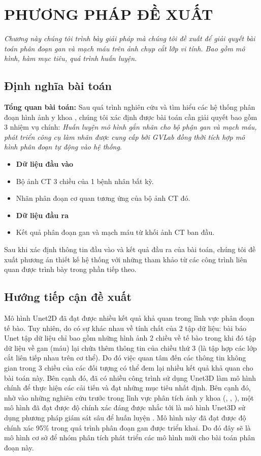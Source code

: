 \chapter{PHƯƠNG PHÁP ĐỀ XUẤT}\label{chap:proposedmethod}
\textit{Chương này chúng tôi trình bày giải pháp mà chúng tôi đề xuất để giải quyết bài toán phân đoạn gan và mạch máu trên ảnh chụp cắt lớp vi tính. Bao gồm mô hình, hàm mục tiêu, quá trình huấn luyện. }

\section{Định nghĩa bài toán}
\textbf{Tổng quan bài toán:} Sau quá trình nghiên cứu và tìm hiểu các hệ thống phân đoạn hình ảnh y khoa , chúng tôi xác định được bài toán cần giải quyết bao gồm 3 nhiệm vụ chính: \textit{Huấn luyện mô hình gắn nhãn cho bộ phận gan và mạch máu, phát triển công cụ làm nhãn được cung cấp bởi GVLab đồng thời tích hợp mô hình phân đoạn tự động vào hệ thống}.
\vspace{-0.25cm}
\begin{itemize}
    \item[] \textbf{Dữ liệu đầu vào}
    \item Bộ ảnh CT 3 chiều của 1 bệnh nhân bất kỳ.
    \item Nhãn phân đoạn cơ quan tương ứng của bộ ảnh CT đó.
    
    \item[] \textbf{Dữ liệu đầu ra}
    \item Kết quả phân đoạn gan và mạch máu từ khối ảnh CT ban đầu.
\end{itemize}
\vspace{-0.25cm}
Sau khi xác định thông tin đầu vào và kết quả đầu ra của bài toán, chúng tôi đề xuất phương án thiết kế hệ thống với những tham khảo từ các công trình liên quan được trình bày trong phần tiếp theo.

\section{Hướng tiếp cận đề xuất}
Mô hình Unet2D \cite{Unet} đã đạt được nhiều kết quả khả quan trong lĩnh vực phân đoạn tế bào. Tuy nhiên, do có sự khác nhau về tính chất của 2 tập dữ liệu: bài báo Unet tập dữ liệu chỉ bao gồm những hình ảnh 2 chiều về tế bào trong khi đó tập dữ liệu về gan (máu) lại chứa thêm thông tin của chiều thứ 3 (là tập hợp các lớp cắt liên tiếp nhau trên cơ thể). Do đó việc quan tâm đến các thông tin không gian trong 3 chiều của các đối tượng có thể đem lại nhiều kết quả khả quan cho bài toán này. Bên cạnh đó, đã có nhiều công trình sử dụng Unet3D \cite{unet3d} làm mô hình chính để thực hiện các cải tiến và đạt những mục tiêu nhất định. Bên cạnh đó, nhờ vào những nghiên cứu trước trong lĩnh vực phân tích ảnh y khoa (\cite{Deepsupervision}, \cite{LV_LIVER}, \cite{LV_VESEL}), một mô hình đã đạt được độ chính xác đáng được nhắc tới là mô hình Unet3D sử dụng phương pháp giám sát sâu để huấn luyện \cite{Deepsupervision}. Mô hình này đã đạt được độ chính xác 95\% trong quá trình phân đoạn gan được \cite{LV_LIVER} triển khai. Do đó đây sẽ là mô hình cơ sở để nhóm phân tích phát triển các mô hình mới cho bài toán phân đoạn này. 

